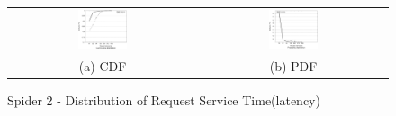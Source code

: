 \begin{figure}[!t]
\begin{center}
\begin{tabular}{cc}
\hspace*{-1cm}                                                           
{\includegraphics[width=0.27\textwidth]{./figs/spider2-reqLatCDF.eps}}&
\hspace{-2mm}
{\includegraphics[width=0.27\textwidth]{./figs/spider2-reqLatPDF.eps}}\\
\small (a) CDF & \small(b) PDF \\
\end{tabular}
\vspace{-0.1in}
\caption{Spider 2 - Distribution of Request Service Time(latency)}
\end{center}
\end{figure}





 

